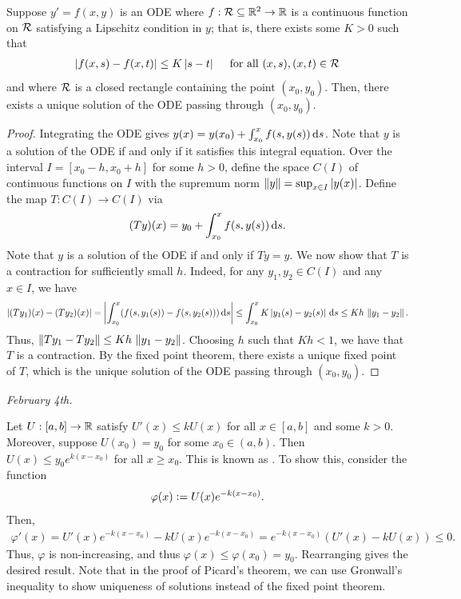 \begin{theorem}
    Suppose $y' = f(x,y)$ is an ODE where $f:\mathcal{R} \subseteq \mathbb{R}^{2} \to \mathbb{R}$ is a continuous function on $\mathcal{R}$ satisfying a Lipschitz condition in $y$; that is, there exists some $K > 0$ such that
    \begin{align}
        \left| f(x,s)-f(x,t) \right| \leq K\left| s-t \right| \quad \text{ for all } (x,s),(x,t) \in \mathcal{R}
    \end{align}
    and where $\mathcal{R}$ is a closed rectangle containing the point $(x_{0},y_{0})$. Then, there exists a unique solution of the ODE passing through $(x_{0},y_{0})$.
\end{theorem}
\begin{proof}
    Integrating the ODE gives $y(x) = y(x_{0}) + \int_{x_{0}}^{x} f(s,y(s)) \, \mathrm{d}s$. Note that $y$ is a solution of the ODE if and only if it satisfies this integral equation. Over the interval $I = [x_{0}-h,x_{0}+h]$ for some $h > 0$, define the space $C(I)$ of continuous functions on $I$ with the supremum norm $\left\lVert y\right\rVert = \sup_{x \in I} \left| y(x) \right|$. Define the map $T:C(I) \to C(I)$ via
    \begin{align}
        (Ty)(x) = y_{0} + \int_{x_{0}}^{x} f(s,y(s)) \, \mathrm{d}s.
    \end{align}
    Note that $y$ is a solution of the ODE if and only if $Ty = y$. We now show that $T$ is a contraction for sufficiently small $h$. Indeed, for any $y_{1},y_{2} \in C(I)$ and any $x \in I$, we have
    \begin{align}
        \left| (Ty_{1})(x) - (Ty_{2})(x) \right| = \left| \int_{x_{0}}^{x} (f(s,y_{1}(s)) - f(s,y_{2}(s))) \, \mathrm{d}s \right| \leq \int_{x_{0}}^{x} K \left| y_{1}(s) - y_{2}(s) \right| \, \mathrm{d}s \leq K h \, \left\lVert y_{1}-y_{2}\right\rVert.
    \end{align}
    Thus, $\left\lVert Ty_{1} - Ty_{2}\right\rVert \leq K h \, \left\lVert y_{1}-y_{2}\right\rVert$. Choosing $h$ such that $K h < 1$, we have that $T$ is a contraction. By the fixed point theorem, there exists a unique fixed point of $T$, which is the unique solution of the ODE passing through $(x_{0},y_{0})$.
\end{proof}


\noindent\textit{February 4th.}

Let $U:[a,b] \to \mathbb{R}$ satisfy $U'(x) \leq k U(x)$ for all $x \in [a,b]$ and some $k > 0$. Moreover, suppose $U(x_{0}) = y_{0}$ for some $x_{0} \in (a,b)$. Then $U(x) \leq y_{0} e^{k(x-x_{0})}$ for all $x \geq x_{0}$. This is known as . To show this, consider the function
\begin{align}
    \varphi(x) \vcentcolon= U(x) e^{-k(x - x_{0})}.
\end{align}
Then,
\begin{align}
    \varphi'(x) = U'(x) e^{-k(x - x_{0})} - k U(x) e^{-k(x - x_{0})} = e^{-k(x - x_{0})} (U'(x) - k U(x)) \leq 0.
\end{align}
Thus, $\varphi$ is non-increasing, and thus $\varphi(x) \leq \varphi(x_{0}) = y_{0}$. Rearranging gives the desired result. Note that in the proof of Picard's theorem, we can use Gronwall's inequality to show uniqueness of solutions instead of the fixed point theorem.


